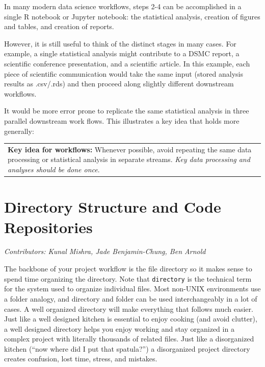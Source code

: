\documentclass[
]{book}
\begin{document}
In many modern data science workflows, steps 2-4 can be accomplished in a single R notebook or Jupyter notebook: the statistical analysis, creation of figures and tables, and creation of reports.

However, it is still useful to think of the distinct stages in many cases. For example, a single statistical analysis might contribute to a DSMC report, a scientific conference presentation, and a scientific article. In this example, each piece of scientific communication would take the same input (stored analysis results as .csv/.rds) and then proceed along slightly different downstream workflows.

It would be more error prone to replicate the same statistical analysis in three parallel downstream work flows. This illustrates a key idea that holds more generally:

\begin{longtable}[]{@{}l@{}}
\toprule\noalign{}
\endhead
\bottomrule\noalign{}
\endlastfoot
\textbf{Key idea for workflows:} Whenever possible, avoid repeating the same data processing or statistical analysis in separate streams. \emph{Key data processing and analyses should be done once}. \\
\end{longtable}

\chapter{Directory Structure and Code Repositories}\label{directory-structure-and-code-repositories}

\emph{Contributors: Kunal Mishra, Jade Benjamin-Chung, Ben Arnold}

The backbone of your project workflow is the file directory so it makes sense to spend time organizing the directory. Note that \texttt{directory} is the technical term for the system used to organize individual files. Most non-UNIX environments use a folder analogy, and directory and folder can be used interchangeably in a lot of cases. A well organized directory will make everything that follows much easier. Just like a well designed kitchen is essential to enjoy cooking (and avoid clutter), a well designed directory helps you enjoy working and stay organized in a complex project with literally thousands of related files. Just like a disorganized kitchen (``now where did I put that spatula?'') a disorganized project directory creates confusion, lost time, stress, and mistakes.
\end{document}
